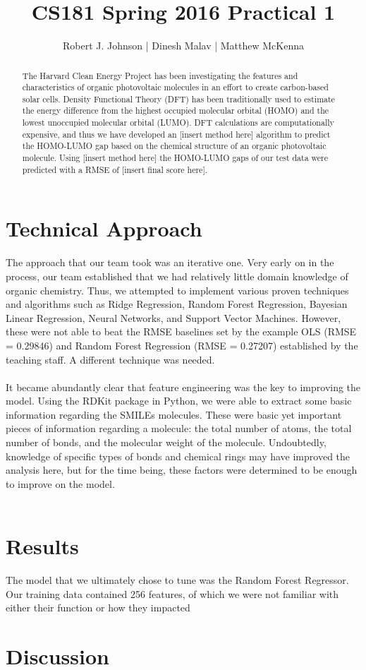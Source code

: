 \documentclass{article}
\begin{document}
\title{CS181 Spring 2016 Practical 1}
\author{Robert J. Johnson | Dinesh Malav | Matthew McKenna}


\maketitle

\begin{abstract}
The Harvard Clean Energy Project has been investigating the features and characteristics of organic photovoltaic molecules in an effort to create carbon-based solar cells. Density Functional Theory (DFT) has been traditionally used to estimate the energy difference from the highest occupied molecular orbital (HOMO) and the lowest unoccupied molecular orbital (LUMO). DFT calculations are computationally expensive, and thus we have developed an [insert method here] algorithm to predict the HOMO-LUMO gap based on the chemical structure of an organic photovoltaic molecule. Using [insert method here] the HOMO-LUMO gaps of our test data were predicted with a RMSE of [insert final score here].
\end{abstract}

\section{Technical Approach}
The approach that our team took was an iterative one. Very early on in the process, our team established that we had relatively little domain knowledge of organic chemistry. Thus, we attempted to implement various proven techniques and algorithms such as Ridge Regression, Random Forest Regression, Bayesian Linear Regression, Neural Networks, and Support Vector Machines. However, these were not able to beat the RMSE baselines set by the example OLS (RMSE = 0.29846) and Random Forest Regression (RMSE = 0.27207) established by the teaching staff. A different technique was needed.\\\\
It became abundantly clear that feature engineering was the key to improving the model. Using the RDKit package in Python, we were able to extract some basic information regarding the SMILEs molecules. These were basic yet important pieces of information regarding a molecule: the total number of atoms, the total number of bonds, and the molecular weight of the molecule. Undoubtedly, knowledge of specific types of bonds and chemical rings may have improved the analysis here, but for the time being, these factors were determined to be enough to improve on the model.\\\\
\section{Results}
The model that we ultimately chose to tune was the Random Forest Regressor. Our training data contained 256 features, of which we were not familiar with either their function or how they impacted
\section{Discussion}
\end{document}
